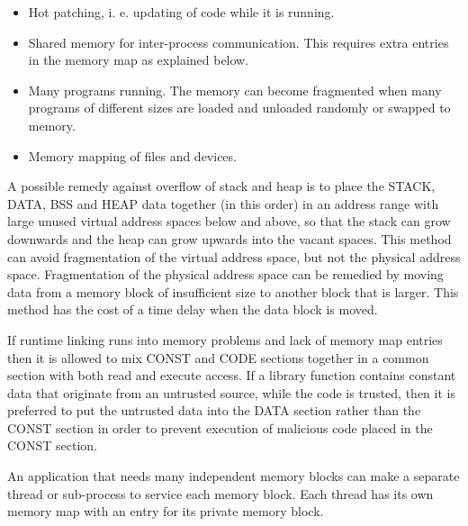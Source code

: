 \documentclass[forwardcom.tex]{subfiles}
\begin{document}
\begin{itemize}
\item Hot patching, i. e. updating of code while it is running. 

\item Shared memory for inter-process communication. This requires extra entries in the memory map as explained below.

\item Many programs running. The memory can become fragmented when many programs of different sizes are loaded and unloaded randomly or swapped to memory. 

\item Memory mapping of files and devices. 

\end{itemize}

A possible remedy against overflow of stack and heap is to place the STACK, DATA, BSS and HEAP data together (in this order) in an address range with large unused virtual address spaces below and above, so that the stack can grow downwards and the heap can grow upwards into the vacant spaces. This method can avoid fragmentation of the virtual address space, but not the physical address space. Fragmentation of the physical address space can be remedied by moving data from a memory block of insufficient size to another block that is larger. This method has the cost of a time delay when the data block is moved. 
\vv

If runtime linking runs into memory problems and lack of memory map entries then it is allowed to mix CONST and CODE sections together in a common section with both read and execute access. If a library function contains constant data that originate from an untrusted source, while the code is trusted, then it is preferred to put the untrusted data into the DATA section rather than the CONST section in order to prevent execution of malicious code placed in the CONST section.
\vv

An application that needs many independent memory blocks can make a separate thread or sub-process to service each memory block. Each thread has its own memory map with an entry for its private memory block.
\vv
\end{document}
